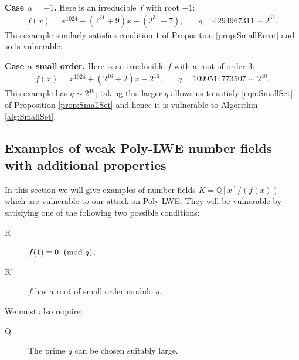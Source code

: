 \documentclass{llncs}
\newcommand{\QQ}{\mathbb{Q}}
\newcommand{\MOD}[1]{~(\textup{mod}~#1)}
\renewcommand{\pmod}{\MOD}
\newcommand{\<}{\langle}
\renewcommand{\>}{\rangle}
\begin{document}
{\bf Case $\alpha = -1$.}  Here is an irreducible $f$ with root $-1$:
\begin{align*}
        f(x) = x^{1024} + (2^{31}+9)x - (2^{31}+7), &\quad q = 4294967311 \sim 2^{32}.
\end{align*}
This example similarly satisfies condition $1$ of Proposition \ref{prop:SmallError} and so is vulnerable.

{\bf Case $\alpha$ small order.}  Here is an irreducible $f$ with a root of order $3$:
\begin{align*}
        f(x) = x^{1024} + (2^{16}+2)x - 2^{16}, &\quad q = 1099514773507 \sim 2^{40}.
\end{align*}
This example has $q \sim 2^{40}$; taking this larger $q$ allows us to satisfy \eqref{eqn:SmallSet} of Proposition \ref{prop:SmallSet} and hence it is vulnerable to Algorithm \ref{alg:SmallSet}.

\subsection{Examples of weak Poly-LWE number fields with additional properties}
\label{sec:ex2}

In this section we will give examples of number fields $K = \QQ[x]/(f(x))$ which are vulnerable to our attack on Poly-LWE.  They will be vulnerable by satisfying one of the following two possible conditions:

\vspace{0.25em}

\begin{minipage}[b]{0.90\linewidth}
\begin{description}
        \item[R\label{small}] $f(1) \equiv 0 \; \pmod q$.
        \item[{R$^\prime$}\label{smallprimeprime}] $f$ has a root of small order modulo $q$.
\end{description}
\end{minipage}

\vspace{0.25em}
\noindent
We must also require:

\vspace{0.25em}

\begin{minipage}[b]{0.90\linewidth}
\begin{description}
        \item[Q\label{big}] The prime $q$ can be chosen suitably large.
\end{description}
\end{minipage}
\end{document}
